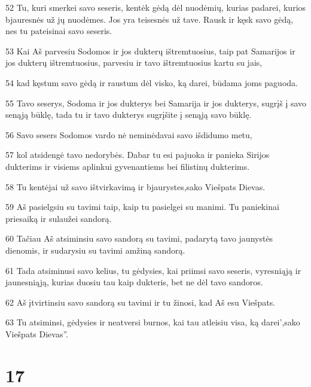\par 52 Tu, kuri smerkei savo seseris, kentėk gėdą dėl nuodėmių, kurias padarei, kurios bjauresnės už jų nuodėmes. Jos yra teisesnės už tave. Rausk ir kęsk savo gėdą, nes tu pateisinai savo seseris. 
\par 53 Kai Aš parvesiu Sodomos ir jos dukterų ištremtuosius, taip pat Samarijos ir jos dukterų ištremtuosius, parvesiu ir tavo ištremtuosius kartu su jais, 
\par 54 kad kęstum savo gėdą ir raustum dėl visko, ką darei, būdama joms paguoda. 
\par 55 Tavo seserys, Sodoma ir jos dukterys bei Samarija ir jos dukterys, sugrįš į savo senąją būklę, tada tu ir tavo dukterys sugrįšite į senąją savo būklę. 
\par 56 Savo sesers Sodomos vardo nė neminėdavai savo išdidumo metu, 
\par 57 kol atsidengė tavo nedorybės. Dabar tu esi pajuoka ir panieka Sirijos dukterims ir visiems aplinkui gyvenantiems bei filistinų dukterims. 
\par 58 Tu kentėjai už savo ištvirkavimą ir bjaurystes,­sako Viešpats Dievas.­ 
\par 59 Aš pasielgsiu su tavimi taip, kaip tu pasielgei su manimi. Tu paniekinai priesaiką ir sulaužei sandorą. 
\par 60 Tačiau Aš atsiminsiu savo sandorą su tavimi, padarytą tavo jaunystės dienomis, ir sudarysiu su tavimi amžiną sandorą. 
\par 61 Tada atsiminusi savo kelius, tu gėdysies, kai priimsi savo seseris, vyresniąją ir jaunesniąją, kurias duosiu tau kaip dukteris, bet ne dėl tavo sandoros. 
\par 62 Aš įtvirtinsiu savo sandorą su tavimi ir tu žinosi, kad Aš esu Viešpats. 
\par 63 Tu atsiminsi, gėdysies ir neatversi burnos, kai tau atleisiu visa, ką darei’,­sako Viešpats Dievas”.



\chapter{17}


